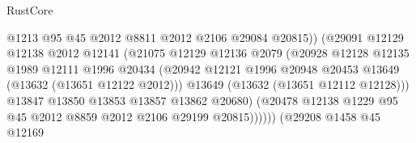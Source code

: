 \begin{lexlean}{RustCore}
\begin{coremodule}
                                        @1213
                                        @95
                                        @45
                                        @2012
                                        @8811
                                        @2012
                                        @2106
                                        @29084
                                        @20815))
                                    (@29091
                                      @12129
                                      @12138
                                      @2012
                                      @12141
                                      (@21075
                                        @12129
                                        @12136
                                        @2079
                                        (@20928
                                          @12128
                                          @12135
                                          @1989
                                          @12111
                                          @1996
                                          @20434
                                          (@20942
                                            @12121
                                            @1996
                                            @20948
                                            @20453
                                            @13649
                                            (@13632 (@13651 @12122 @2012)))
                                          @13649
                                          (@13632 (@13651 @12112 @12128)))
                                        @13847
                                        @13850
                                        @13853
                                        @13857
                                        @13862
                                        @20680)
                                      (@20478
                                        @12138
                                        @1229
                                        @95
                                        @45
                                        @2012
                                        @8859
                                        @2012
                                        @2106
                                        @29199
                                        @20815))))))
                            (@29208
                              @1458
                              @45
                              @12169

\end{coremodule}
\end{lexlean}

